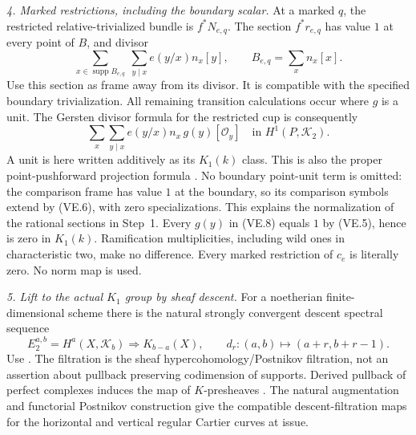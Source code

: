 \emph{4. Marked restrictions, including the boundary scalar.}
At a marked $q$, the restricted relative-trivialized bundle is
$f^*N_{e,q}$. The section $f^*r_{e,q}$ has value $1$ at every
point of $B$, and divisor
\[
 \sum_{x\in\operatorname{supp}B_{e,q}}\ \sum_{y\mid x}
                      e(y/x)n_x[y],
              \qquad B_{e,q}=\sum_x n_x[x].
\]
Use this section as frame away from its divisor. It is compatible
with the specified boundary trivialization. All remaining
transition calculations occur where $g$ is a unit.
The Gersten divisor formula for the restricted cup is consequently
\begin{equation}
 \sum_x\sum_{y\mid x} e(y/x)n_x\,g(y)[\mathcal O_y]
                          \quad\text{in }H^1(P,\mathcal K_2).
                                                               \tag{VE.8}
\end{equation}
A unit is here written additively as its $K_1(k)$ class.
This is also the proper point-pushforward projection formula
\citep[Section 7, Propositions 2.10 and 3.2]{rootQuillen1973}.
No boundary point-unit term is omitted: the comparison frame has
value $1$ at the boundary, so its comparison symbols extend by
(VE.6), with zero specializations. This explains the normalization
of the rational sections in Step~1.
Every $g(y)$ in (VE.8) equals $1$ by (VE.5), hence is zero in
$K_1(k)$. Ramification multiplicities, including wild ones in
characteristic two, make no difference. Every marked restriction
of $c_e$ is literally zero. No norm map is used.

\emph{5. Lift to the actual $K_1$ group by sheaf descent.}
For a noetherian finite-dimensional scheme there is the natural
strongly convergent descent spectral sequence
\begin{equation}
 E_2^{a,b}=H^a(X,\mathcal K_b)\Longrightarrow K_{b-a}(X),
 \qquad d_r:(a,b)\longmapsto(a+r,b+r-1).
                                                               \tag{VE.9}
\end{equation}
Use \citet[Theorem 10.3 and proof, pp.~383--386;
Appendix D.4--D.5 and proofs, pp.~424--426]{D_ThomasonTrobaugh1990}.
The filtration is the sheaf hypercohomology/Postnikov filtration,
not an assertion about pullback preserving codimension of supports.
Derived pullback of perfect complexes induces the map of $K$-presheaves
\citep[Sections 3.14--3.15, pp.~317--319]{D_ThomasonTrobaugh1990}.
The natural augmentation and functorial Postnikov construction give
the compatible descent-filtration maps for the horizontal and
vertical regular Cartier curves at issue.

